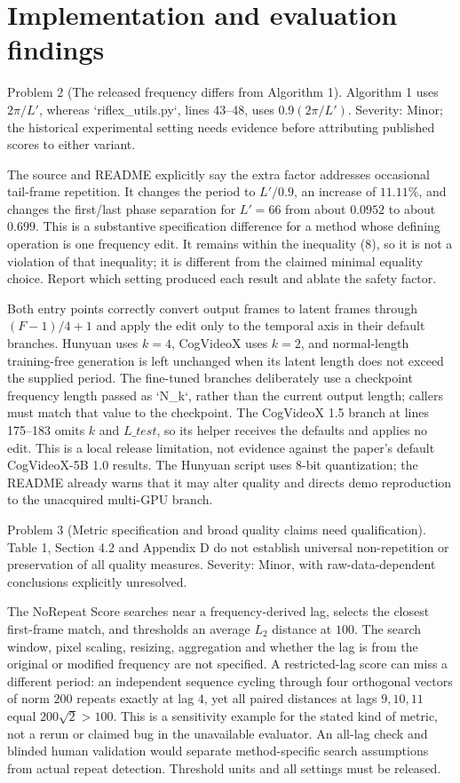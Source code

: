 \documentclass[10pt]{article}
\begin{document}
\section*{Implementation and evaluation findings}
Problem 2 (The released frequency differs from Algorithm 1).  Algorithm 1 uses \(2\pi/L'\), whereas `riflex\_utils.py`, lines 43–48, uses \(0.9(2\pi/L')\). Severity: Minor; the historical experimental setting needs evidence before attributing published scores to either variant.\par
The source and README explicitly say the extra factor addresses occasional tail-frame repetition. It changes the period to \(L'/0.9\), an increase of \(11.11\%\), and changes the first/last phase separation for \(L'=66\) from about \(0.0952\) to about \(0.699\). This is a substantive specification difference for a method whose defining operation is one frequency edit. It remains within the inequality (8), so it is not a violation of that inequality; it is different from the claimed minimal equality choice. Report which setting produced each result and ablate the safety factor.\par
Both entry points correctly convert output frames to latent frames through \((F-1)/4+1\) and apply the edit only to the temporal axis in their default branches. Hunyuan uses \(k=4\), CogVideoX uses \(k=2\), and normal-length training-free generation is left unchanged when its latent length does not exceed the supplied period. The fine-tuned branches deliberately use a checkpoint frequency length passed as `N\_k`, rather than the current output length; callers must match that value to the checkpoint. The CogVideoX 1.5 branch at lines 175–183 omits \(k\) and \(L\_test\), so its helper receives the defaults and applies no edit. This is a local release limitation, not evidence against the paper’s default CogVideoX-5B 1.0 results. The Hunyuan script uses 8-bit quantization; the README already warns that it may alter quality and directs demo reproduction to the unacquired multi-GPU branch.\par
Problem 3 (Metric specification and broad quality claims need qualification).  Table 1, Section 4.2 and Appendix D do not establish universal non-repetition or preservation of all quality measures. Severity: Minor, with raw-data-dependent conclusions explicitly unresolved.\par
The NoRepeat Score searches near a frequency-derived lag, selects the closest first-frame match, and thresholds an average \(L_2\) distance at \(100\). The search window, pixel scaling, resizing, aggregation and whether the lag is from the original or modified frequency are not specified. A restricted-lag score can miss a different period: an independent sequence cycling through four orthogonal vectors of norm \(200\) repeats exactly at lag \(4\), yet all paired distances at lags \(9,10,11\) equal \(200\sqrt2>100\). This is a sensitivity example for the stated kind of metric, not a rerun or claimed bug in the unavailable evaluator. An all-lag check and blinded human validation would separate method-specific search assumptions from actual repeat detection. Threshold units and all settings must be released.\par
\end{document}
